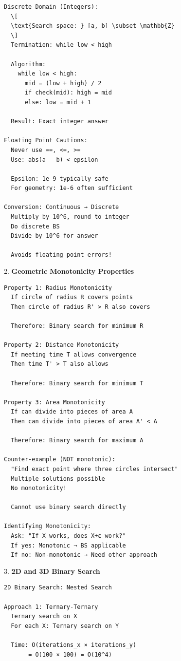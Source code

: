 \documentclass[11pt,a4paper,oneside]{book}
\begin{document}
\begin{tcolorbox}[
    enhanced,breakable,
    colback=white,
    colframe=deepblue,
    boxrule=1.5pt,
    arc=3mm,
    title=\textbf{Spatial Monotonicity and Continuous Optimization}
]
\begin{verbatim}
Discrete Domain (Integers):
  \[
  \text{Search space: } [a, b] \subset \mathbb{Z}
  \]
  Termination: while low < high
  
  Algorithm:
    while low < high:
      mid = (low + high) / 2
      if check(mid): high = mid
      else: low = mid + 1
  
  Result: Exact integer answer

Floating Point Cautions:
  Never use ==, <=, >=
  Use: abs(a - b) < epsilon
  
  Epsilon: 1e-9 typically safe
  For geometry: 1e-6 often sufficient

Conversion: Continuous → Discrete
  Multiply by 10^6, round to integer
  Do discrete BS
  Divide by 10^6 for answer
  
  Avoids floating point errors!
\end{verbatim}

2. \textbf{Geometric Monotonicity Properties}
\begin{verbatim}
Property 1: Radius Monotonicity
  If circle of radius R covers points
  Then circle of radius R' > R also covers
  
  Therefore: Binary search for minimum R

Property 2: Distance Monotonicity
  If meeting time T allows convergence
  Then time T' > T also allows
  
  Therefore: Binary search for minimum T

Property 3: Area Monotonicity
  If can divide into pieces of area A
  Then can divide into pieces of area A' < A
  
  Therefore: Binary search for maximum A

Counter-example (NOT monotonic):
  "Find exact point where three circles intersect"
  Multiple solutions possible
  No monotonicity!
  
  Cannot use binary search directly

Identifying Monotonicity:
  Ask: "If X works, does X+ε work?"
  If yes: Monotonic → BS applicable
  If no: Non-monotonic → Need other approach
\end{verbatim}

3. \textbf{2D and 3D Binary Search}
\begin{verbatim}
2D Binary Search: Nested Search

Approach 1: Ternary-Ternary
  Ternary search on X
  For each X: Ternary search on Y
  
  Time: O(iterations_x × iterations_y)
       = O(100 × 100) = O(10^4)
  

\end{verbatim}
\end{tcolorbox}
\end{document}
